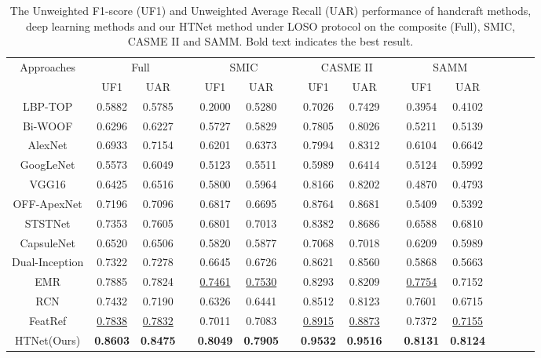 \documentclass[review,12pt, 3p]{elsarticle}
\begin{document}
\begin{table*}[!t]
\centering
\scriptsize
\caption{ The Unweighted F1-score (UF1) and Unweighted Average Recall (UAR) performance of handcraft methods, deep learning methods and our HTNet method under LOSO protocol on the composite (Full), SMIC, CASME II and SAMM. Bold text indicates the best result.}
\begin{tabular}{c c c c c c c c c c c c c c c  c }
\hline
 \multirow{2}{*}{Approaches} &\multicolumn{3}{c}{Full} &\multicolumn{3}{c}{SMIC}&\multicolumn{3}{c}{CASME II}&\multicolumn{3}{c}{SAMM}\\
\cline{2-3} \cline{5-6} \cline{8-9} \cline{11-12}
 &UF1 &UAR& &UF1 &UAR &  &UF1 &UAR &  &UF1 &UAR& \\
\hline
LBP-TOP \cite{ref-23} &0.5882 &0.5785& &0.2000 &0.5280 &  &0.7026 &0.7429 &  &0.3954 &0.4102 &\\
Bi-WOOF \cite{ref-24}&0.6296 &0.6227& &0.5727 &0.5829 &  &0.7805 &0.8026 &  &0.5211 &0.5139& \\
\hline
AlexNet \cite{ref-11} &0.6933 & 0.7154 & &0.6201& 0.6373 & &0.7994 & 0.8312 & &0.6104  &0.6642& \\
GoogLeNet \cite{ref-13}    &0.5573& 0.6049& & 0.5123& 0.5511& & 0.5989 & 0.6414 & &0.5124 & 0.5992& \\
VGG16 \cite{ref-14}          &0.6425 &0.6516 & & 0.5800 &0.5964 & &0.8166 & 0.8202  & &0.4870 & 0.4793& \\
OFF-ApexNet \cite{ref-9}&0.7196 & 0.7096 & & 0.6817 & 0.6695 & & 0.8764 & 0.8681& & 0.5409 &0.5392& \\
STSTNet \cite{ref-5}     &0.7353  & 0.7605  & &0.6801& 0.7013 & &0.8382 & 0.8686& & 0.6588 &0.6810& \\
CapsuleNet \cite{ref-43} &0.6520 & 0.6506 & & 0.5820 & 0.5877 & & 0.7068 &0.7018 & & 0.6209& 0.5989& \\
Dual-Inception \cite{ref-44}&0.7322 &0.7278& & 0.6645 & 0.6726 & & 0.8621 & 0.8560 & &0.5868 & 0.5663& \\
EMR  \cite{ref-8}              &0.7885 &0.7824  & &\underline{0.7461}& \underline{0.7530} & & 0.8293 &0.8209 & &\underline{0.7754} & 0.7152& \\
RCN  \cite{ref-6}   &0.7432 &0.7190& &0.6326 &0.6441 &  &0.8512 &0.8123 &  &0.7601 &0.6715& \\
FeatRef \cite{ref-15} &\underline{0.7838} & \underline{0.7832}  & &0.7011 & 0.7083 & & \underline{0.8915} & \underline{0.8873} & &0.7372 & \underline{0.7155}& \\
HTNet(Ours) &\textbf{0.8603} & \textbf{0.8475}  & &\textbf{0.8049} & \textbf{0.7905} & & \textbf{0.9532} & \textbf{0.9516} & &\textbf{0.8131} & \textbf{0.8124}& \\
\hline
\end{tabular}
 \label{sota-results-composite}
\end{table*}
\end{document}
